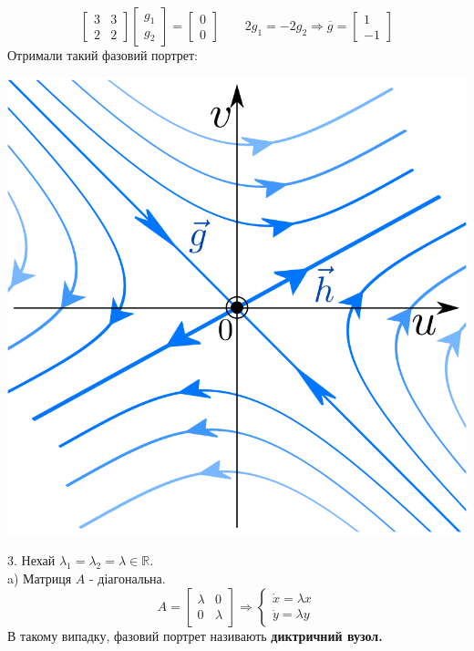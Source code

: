 \begin{example}
    $$
    \begin{bmatrix}
     3 &3 \\
     2 & 2
    \end{bmatrix} \begin{bmatrix}
     g_1 \\
     g_2
    \end{bmatrix} = \begin{bmatrix}
     0 \\
     0
    \end{bmatrix} \qquad 2 g_1 =-2 g_2 \Rightarrow \overline{g} = \begin{bmatrix}
     1 \\
     -1
    \end{bmatrix}
    $$
    Отримали такий фазовий портрет:
    \begin{center} \includegraphics[scale=0.3]{assets/lectures_recent-c4b9c37b.png} \end{center}
    \end{example}


    3. Нехай $ \lambda_1 = \lambda_2 = \lambda \in \mathbb{R}$.\\
    a) Матриця $A$ - діагональна.
    $$
    A = \begin{bmatrix}
     \lambda & 0 \\
     0 & \lambda
    \end{bmatrix} \Longrightarrow \begin{cases}
        \dot{x} = \lambda x\\
        \dot{y} = \lambda y
    \end{cases}
    $$
    В такому випадку, фазовий портрет називають \textbf{диктричний вузол.}




